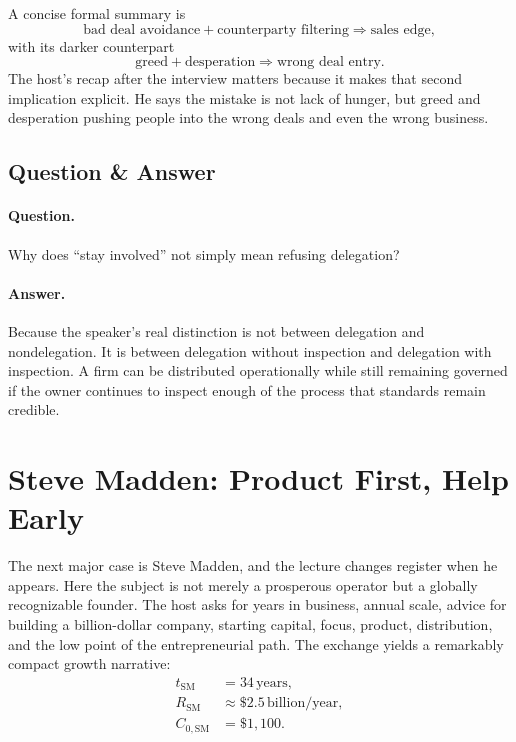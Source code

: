 A concise formal summary is
\begin{equation}
\text{bad deal avoidance} + \text{counterparty filtering} \Rightarrow \text{sales edge},
\end{equation}
with its darker counterpart
\begin{equation}
\text{greed} + \text{desperation} \Rightarrow \text{wrong deal entry}.
\end{equation}
The host's recap after the interview matters because it makes that second implication explicit. He says the mistake is not lack of hunger, but greed and desperation pushing people into the wrong deals and even the wrong business.

\subsection{Question \& Answer}

\paragraph{Question.} Why does ``stay involved'' not simply mean refusing delegation?

\paragraph{Answer.} Because the speaker's real distinction is not between delegation and nondelegation. It is between delegation without inspection and delegation with inspection. A firm can be distributed operationally while still remaining governed if the owner continues to inspect enough of the process that standards remain credible.

\section{Steve Madden: Product First, Help Early}

The next major case is Steve Madden, and the lecture changes register when he appears. Here the subject is not merely a prosperous operator but a globally recognizable founder. The host asks for years in business, annual scale, advice for building a billion-dollar company, starting capital, focus, product, distribution, and the low point of the entrepreneurial path. The exchange yields a remarkably compact growth narrative:
\begin{align}
t_{\text{SM}} &= 34\,\text{years},\\
R_{\text{SM}} &\approx \$2.5\,\text{billion/year},\\
C_{0,\text{SM}} &= \$1{,}100.
\end{align}

